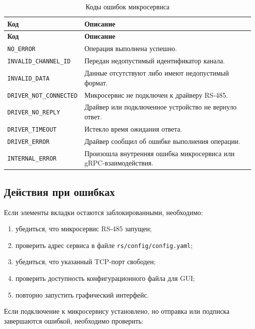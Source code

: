 \begin{longtable}{|p{}|p{}|}
	\caption{Коды ошибок микросервиса} \\
	\hline
	\textbf{Код} & \textbf{Описание} \\
	\hline
	\endfirsthead
	\hline
	\textbf{Код} & \textbf{Описание} \\
	\hline
	\endhead
	\texttt{NO\_ERROR} & Операция выполнена успешно. \\
	\hline
	\texttt{INVALID\_CHANNEL\_ID} & Передан недопустимый идентификатор канала. \\
	\hline
	\texttt{INVALID\_DATA} & Данные отсутствуют либо имеют недопустимый формат. \\
	\hline
	\texttt{DRIVER\_NOT\_CONNECTED} & Микросервис не подключен к драйверу RS-485. \\
	\hline
	\texttt{DRIVER\_NO\_REPLY} & Драйвер или подключенное устройство не вернуло ответ. \\
	\hline
	\texttt{DRIVER\_TIMEOUT} & Истекло время ожидания ответа. \\
	\hline
	\texttt{DRIVER\_ERROR} & Драйвер сообщил об ошибке выполнения операции. \\
	\hline
	\texttt{INTERNAL\_ERROR} & Произошла внутренняя ошибка микросервиса или gRPC-взаимодействия. \\
	\hline
\end{longtable}

\subsection{Действия при ошибках}

Если элементы вкладки остаются заблокированными, необходимо:

\begin{enumerate}
	\item убедиться, что микросервис RS-485 запущен;
	\item проверить адрес сервиса в файле \texttt{rs/config/config.yaml};
	\item убедиться, что указанный TCP-порт свободен;
	\item проверить доступность конфигурационного файла для GUI;
	\item повторно запустить графический интерфейс.
\end{enumerate}

Если подключение к микросервису установлено, но отправка или подписка
завершаются ошибкой, необходимо проверить:

